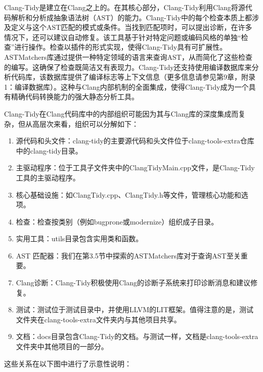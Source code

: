 


Clang-Tidy是建立在Clang之上的。在其核心部分，Clang-Tidy利用Clang将源代码解析和分析成抽象语法树（AST）的能力。Clang-Tidy中的每个检查本质上都涉及定义与这个AST匹配的模式或条件。当找到匹配项时，可以提出诊断，在许多情况下，还可以建议自动修复。该工具基于针对特定问题或编码风格的单独“检查”进行操作。检查以插件的形式实现，使得Clang-Tidy具有可扩展性。ASTMatchers库通过提供一种特定领域的语言来查询AST，从而简化了这些检查的编写。这确保了检查既简洁又有表现力。Clang-Tidy还支持使用编译数据库来分析代码库，该数据库提供了编译标志等上下文信息（更多信息请参见第9章，附录1：编译数据库）。这种与Clang内部机制的全面集成，使得Clang-Tidy成为一个具有精确代码转换能力的强大静态分析工具。



Clang-Tidy在Clang代码库中的内部组织可能因为其与Clang库的深度集成而复杂，但从高层次来看，组织可以分解如下：

\begin{enumerate}
\item
源代码和头文件：clang-tidy的主要源代码和头文件位于clang-tools-extra仓库中的clang-tidy目录。

\item
主驱动程序：位于工具子文件夹中的ClangTidyMain.cpp文件，是Clang-Tidy工具的主驱动程序。

\item
核心基础设施：如ClangTidy.cpp、ClangTidy.h等文件，管理核心功能和选项。

\item
检查：检查按类别（例如bugprone或modernize）组织成子目录。

\item
实用工具：utils目录包含实用类和函数。

\item
AST 匹配器：我们在第3.5节中探索的ASTMatchers库对于查询AST至关重要。

\item
Clang诊断：Clang-Tidy积极使用Clang的诊断子系统来打印诊断消息和建议修复。

\item
测试：测试位于测试目录中，并使用LLVM的LIT框架。值得注意的是，测试文件夹在clang-tools-extra文件夹内与其他项目共享。

\item
文档：docs目录包含Clang-Tidy的文档。与测试一样，文档是clang-tools-extra文件夹中其他项目的一部分。
\end{enumerate}

这些关系在以下图中进行了示意性说明：

